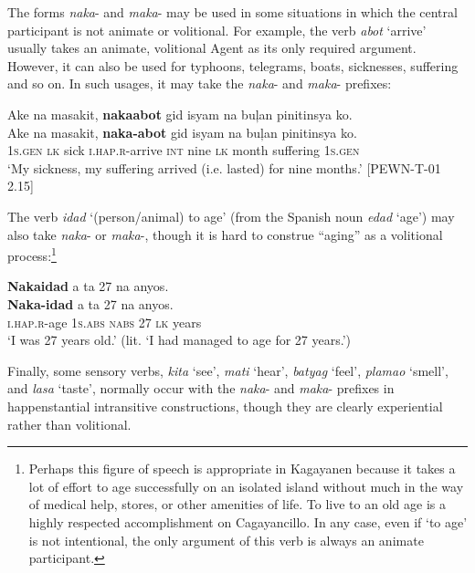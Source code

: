 The forms \textit{naka}{}- and \textit{maka}{}- may be used in some situations in which the central participant is not animate or volitional. For example, the verb \textit{abot} ‘arrive’ usually takes an animate, volitional Agent as its only required argument. However, it can also be used for typhoons, telegrams, boats, sicknesses, suffering and so on. In such usages, it may take the \textit{naka}{}- and \textit{maka}{}- prefixes:

\ea
Ake  na  masakit,  \textbf{nakaabot}  gid  isyam  na  buļan  pinitinsya  ko. \\\smallskip
 \gll Ake  na  masakit,  \textbf{naka-abot}  gid  isyam  na  buļan  pinitinsya  ko. \\
1\textsc{s.gen}  \textsc{lk}  sick  \textsc{i.hap.r}-arrive  \textsc{int}  nine  \textsc{lk}  month  suffering  1\textsc{s.gen} \\
\glt ‘My sickness, my suffering arrived (i.e. lasted) for nine months.’ [PEWN-T-01 2.15]
\z

The verb \textit{idad} ‘(person/animal) to age’ (from the Spanish noun \textit{edad} ‘age’) may also take \textit{naka}{}- or \textit{maka}{}-, though it is hard to construe “aging” as a volitional process:\footnote{Perhaps this figure of speech is appropriate in Kagayanen because it takes a lot of effort to age successfully on an isolated island without much in the way of medical help, stores, or other amenities of life. To live to an old age is a highly respected accomplishment on Cagayancillo.  In any case, even if ‘to age’ is not intentional, the only argument of this verb is always an animate participant.}

\ea
\textbf{Nakaidad}  a  ta  27  na  anyos. \\\smallskip
 \gll \textbf{Naka-idad}  a  ta  27  na  anyos. \\
\textsc{i.hap.r}-age  1\textsc{s.abs}  \textsc{nabs}  27  \textsc{lk}  years \\
\glt ‘I was 27 years old.’ (lit. ‘I had managed to age for 27 years.’)
\z

Finally, some sensory verbs, \textit{kita} ‘see’, \textit{mati} ‘hear’,  \textit{batyag} ‘feel’, \textit{plamao} `smell', and \textit{lasa} ‘taste’, normally occur with the \textit{naka}{}- and \textit{maka}{}- prefixes in happenstantial intransitive constructions, though they are clearly experiential rather than volitional.

